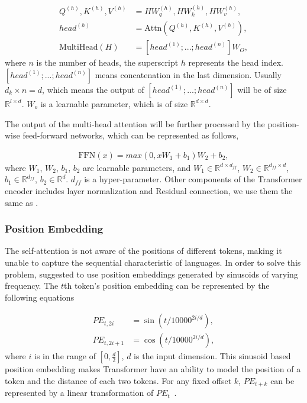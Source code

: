 \documentclass[11pt,a4paper]{article}
\begin{document}
\vspace{-1em}
{\small
\begin{align}
  Q^{(h)}, K^{(h)}, V^{(h)} & = HW_{q}^{(h)}, HW_{k}^{(h)}, HW_{v}^{(h)}, \\
  head^{(h)} & = \mathrm{Attn}(Q^{(h)}, K^{(h)}, V^{(h)}), \\
  \mathrm{MultiHead}(H) & = [head^{(1)}; ...; head^{(n)}]W_O, \label{eq:multi-head}
\end{align}
}where $n$ is the number of heads, the superscript $h$ represents the head index. $[head^{(1)}; ...; head^{(n)}]$ means concatenation in the last dimension. Usually $d_k \times n = d$, which means the output of $[head^{(1)}; ...; head^{(n)}]$ will be of size $\mathbb{R}^{l \times d}$. $W_o$ is a learnable parameter, which is of size $\mathbb{R}^{d \times d}$.

The output of the multi-head attention will be further processed by the position-wise feed-forward networks, which can be represented as follows,

\vspace{-1em}
{\small
\begin{align}
  \mathrm{FFN}(x) = max(0, xW_1 + b_1)W_2 + b_2, \label{eq:ffn}
\end{align}
}where $W_1$, $W_2$, $b_1$, $b_2$ are learnable parameters, and $W_1 \in \mathbb{R}^{d \times d_{ff}}$, $W_2 \in \mathbb{R}^{d_{ff} \times d}$, $b_1 \in \mathbb{R}^{d_{ff}}$, $b_2 \in \mathbb{R}^{d}$. $d_{ff}$ is a hyper-parameter. Other components of the Transformer encoder includes layer normalization and Residual connection, we use them the same as \cite{vaswani2017attention}.

\subsubsection{Position Embedding} \label{sec:position_embedding}

The self-attention is not aware of the positions of different tokens, making it unable to capture the sequential characteristic of languages. In order to solve this problem, \citep{vaswani2017attention} suggested to use position embeddings generated by sinusoids of varying frequency. The $t$th token's position embedding can be represented by the following equations

\vspace{-1em}
{\small
  \begin{align}
    PE_{t,2i} & = \sin(t/10000^{2i/d}), \label{eq:position_embedding1} \\
    PE_{t,2i+1} & = \cos(t/10000^{2i/d}),  \label{eq:position_embedding2}
  \end{align}
}where $i$ is in the range of $[0, \frac{d}{2}]$, $d$ is the input dimension. This sinusoid based position embedding makes Transformer have an ability to model the position of a token and the distance of each two tokens. For any fixed offset $k$, $PE_{t+k}$ can be represented by a linear transformation of $PE_{t}$~\cite{vaswani2017attention}.
\end{document}
